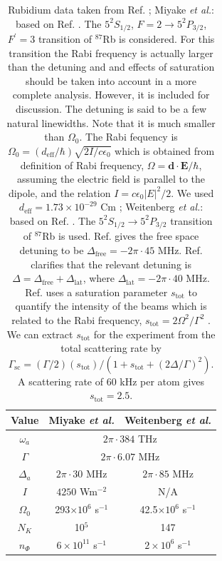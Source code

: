 \begin{table}[!htbp]
  \centering
  \begin{tabular}{|c|c|c|}
    \hline
    Value & Miyake \emph{et al.} & Weitenberg \emph{et al.} \\ \hline
    $\omega_a$ & \multicolumn{2}{|c|}{$2 \pi \cdot 384$ THz}\\ \hline
    $\Gamma$ & \multicolumn{2}{|c|}{$2 \pi \cdot 6.07$ MHz} \\ \hline
    $\Delta_a$ & $2\pi \cdot 30$ MHz & $2 \pi \cdot 85$ MHz \\ \hline
    $I$ & $4250$ Wm$^{-2}$ & N/A \\ \hline
    $\Omega_0$ & 293$\times 10^6$ s$^{-1}$ & 42.5$\times 10^6$ s$^{-1}$ \\ \hline
    $N_K$ & 10$^5$ & 147 \\ \hline \hline
    $n_{\Phi}$ & $6 \times 10^{11}$ s$^{-1}$ & $2 \times 10^6$ s$^{-1}$ \\ \hline
  \end{tabular}
  \caption[Photon Scattering Rates]{ Rubidium data taken from
    Ref. \cite{steck}; Miyake \emph{et al.}: based on
    Ref. \cite{miyake2011}. The $5^2S_{1/2}$, $F=2 \rightarrow
    5^2P_{3/2}$, $F^\prime = 3$ transition of $^{87}$Rb is
    considered. For this transition the Rabi frequency is actually
    larger than the detuning and and effects of saturation should be
    taken into account in a more complete analysis. However, it is
    included for discussion. The detuning is said to be a few natural
    linewidths. Note that it is much smaller than $\Omega_0$. The Rabi
    fequency is $\Omega_0 = (d_\mathrm{eff}/\hbar)\sqrt{2 I / c
      \epsilon_0}$ which is obtained from definition of Rabi
    frequency, $\Omega = \mathbf{d} \cdot \mathbf{E} / \hbar$,
    assuming the electric field is parallel to the dipole, and the
    relation $I = c \epsilon_0 |E|^2 /2$. We used $d_\mathrm{eff} =
    1.73 \times 10^{-29}$ Cm \cite{steck}; Weitenberg \emph{et al.}:
    based on Ref. \cite{weitenberg2011, weitenbergThesis}. The
    $5^2S_{1/2} \rightarrow 5^2P_{3/2}$ transition of $^{87}$Rb is
    used. Ref. \cite{weitenberg2011} gives the free space detuning to
    be $\Delta_\mathrm{free} = - 2 \pi \cdot 45$
    MHz. Ref. \cite{weitenbergThesis} clarifies that the relevant
    detuning is $\Delta = \Delta_\mathrm{free} + \Delta_\mathrm{lat}$,
    where $\Delta_\mathrm{lat} = - 2 \pi \cdot 40$
    MHz. Ref. \cite{weitenbergThesis} uses a saturation parameter
    $s_\mathrm{tot}$ to quantify the intensity of the beams which is
    related to the Rabi frequency, $s_\mathrm{tot} = 2 \Omega^2 /
    \Gamma^2$ \cite{steck,foot}. We can extract $s_\mathrm{tot}$ for
    the experiment from the total scattering rate by
    $\Gamma_\mathrm{sc} = (\Gamma/2) (s_\mathrm{tot}) /
    (1+s_\mathrm{tot}+(2 \Delta / \Gamma)^2)$. A scattering rate of 60
    kHz per atom \cite{weitenberg2011} gives $s_\mathrm{tot} = 2.5$.}
  \label{tab:photons}
\end{table}

